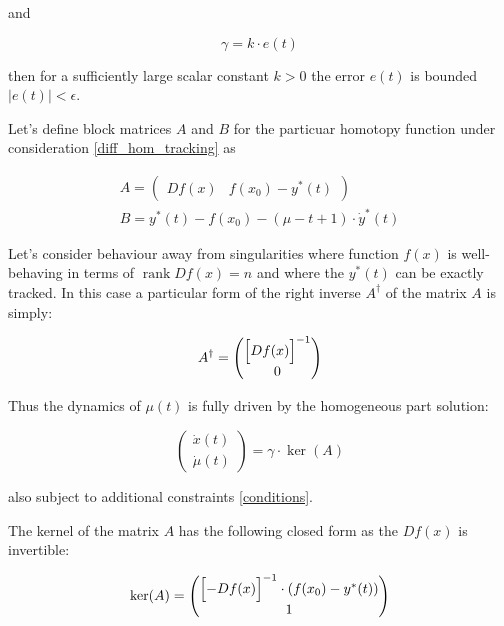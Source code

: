 \documentclass[11pt,american]{article}
\DeclareMathOperator{\rank}{\operatorname{rank}}
\begin{document}
and

\begin{equation}
\gamma = k \cdot e(t)
\end{equation}

then for a sufficiently large scalar constant $k > 0$ the error $e(t)$ is bounded $|e(t)| < \epsilon$.

Let's define block matrices $A$ and $B$ for the particuar homotopy function under consideration \eqref{diff_hom_tracking} as

\begin{equation}\label{conditions}
\begin{gathered}
A = \begin{pmatrix}
D f(x) & f(x_0) - y^*(t)
\end{pmatrix} \\
B = y^*(t) - f(x_0) - (\mu - t + 1) \cdot \dot y^*(t)
\end{gathered}
\end{equation}

Let's consider behaviour away from singularities where function $f(x)$ is well-behaving in terms of $\rank D f(x)=n$ and where the $y^*(t)$ can be exactly tracked.
In this case a particular form of the right inverse $A^\dagger$ of the matrix $A$ is simply:

\begin{equation}
A^\dagger = \begin{pmatrix}
\Bigl[ D f(x) \Bigr]^{-1} \\ 0
\end{pmatrix}
\end{equation}

Thus the dynamics of $\mu(t)$ is fully driven by the homogeneous part solution:

\begin{equation}
\begin{pmatrix} \dot{x}(t) \\ \dot{\mu}(t) \end{pmatrix} = \gamma \cdot \ker(A)
\end{equation}

also subject to additional constraints \eqref{conditions}.

The kernel of the matrix $A$ has the following closed form as the $D f(x)$ is invertible:

\begin{equation}
\ker(A) = \begin{pmatrix}
\Bigl[ - D f(x) \Bigr]^{-1} \cdot (f(x_0) - y^*(t)) \\ 1
\end{pmatrix}
\end{equation}
\end{document}
